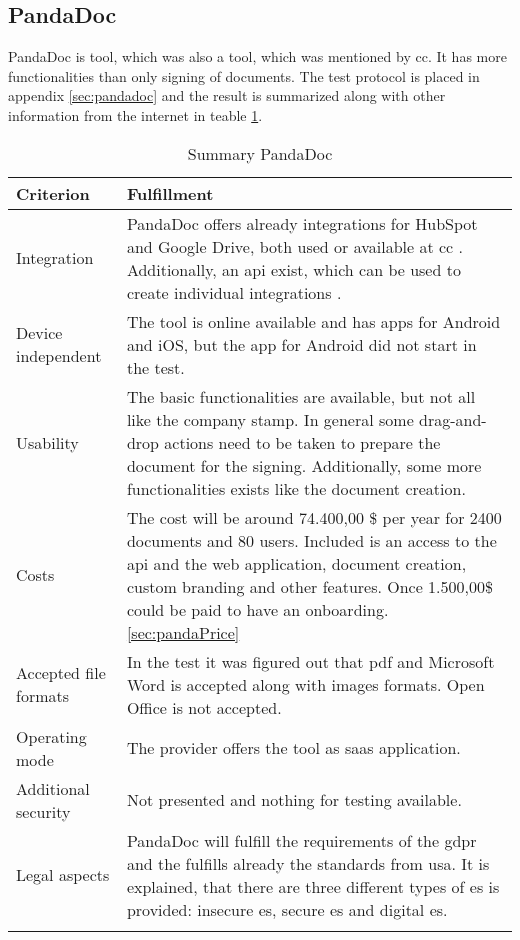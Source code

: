 \subsection{PandaDoc}
PandaDoc is tool, which was also a tool, which was mentioned by \gls{cc}. It has more functionalities than only signing of documents. The test protocol is placed in appendix \ref{sec:pandadoc} and the result is summarized along with other information from the internet in teable \ref{tab:pandadoc}. 
	\begin{longtable}{|p{4cm}|p{10cm}|} \hline
		Criterion & Fulfillment \\ \hline
		Integration & PandaDoc offers already integrations for HubSpot and Google Drive, both used or available at \gls{cc} \parencite{pandadoc2018integration}. Additionally, an \gls{api} exist, which can be used to create individual integrations \parencite{pandadoc2018api}. \\ \hline
		Device independent & The tool is online available and has \glspl{app} for Android and iOS, but the \gls{app} for Android did not start in the test. \\ \hline
		Usability & The basic functionalities are available, but not all like the company stamp. In general some drag-and-drop actions need to be taken to prepare the document for the signing. Additionally, some more functionalities exists like the document creation.\\ \hline
		Costs & The cost will be around 74.400,00 \$ per year for 2400 documents and 80 users. Included is an access to the \gls{api} and the web application, document creation, custom branding and other features. Once 1.500,00\$ could be paid to have an onboarding.  \ref{sec:pandaPrice} \\ \hline
		Accepted file formats & In the test it was figured out that \gls{pdf} and Microsoft Word is accepted along with images formats. Open Office is not accepted. \\ \hline
		Operating mode & The provider offers the tool as \gls{saas} application. \parencite{pandadoc2018saas} \\ \hline
		Additional security & Not presented and nothing for testing available. \\ \hline
		Legal aspects & PandaDoc will fulfill the requirements of the \gls{gdpr} and the fulfills already the standards from \gls{usa}. It is explained, that there are three different types of \gls{es} is provided: insecure \gls{es}, secure \gls{es} and digital \gls{es}.  \parencite{pandadoc2018gdp,pandadoc2018legal} \\ \hline
	\caption{Summary PandaDoc}
	\label{tab:pandadoc}
	\end{longtable}

